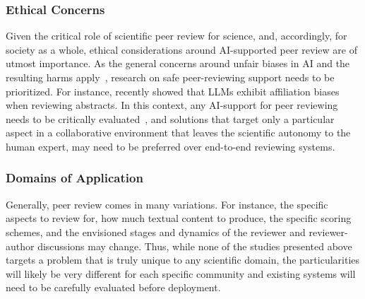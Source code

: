 \subsubsection{Ethical Concerns}
Given the critical role of scientific peer review for science, and, accordingly, for society as a whole, ethical considerations around AI-supported peer review are of utmost importance. As the general concerns around unfair biases in AI and the resulting harms apply~\cite{kuznetsov2024can}, research on safe peer-reviewing support needs to be prioritized. For instance, \citet{10.1001/jama.2023.24641} recently showed that %
LLMs exhibit 
affiliation biases when reviewing abstracts. In this context, any AI-support for peer reviewing needs to be critically evaluated~\cite{schintler2023critical}, and solutions that target only a particular aspect in a collaborative environment that leaves the scientific autonomy to the human expert, may need to be preferred over end-to-end reviewing systems.



\subsubsection{Domains of Application}
Generally, peer review comes in many variations. For instance, the specific aspects to review for, how much textual content to produce, the specific scoring schemes, and the envisioned stages and dynamics of the reviewer and reviewer-author discussions may change. Thus, while none of the studies presented above targets a problem that is truly unique to any scientific domain, the particularities will likely be very different for each specific community and existing systems will need to be carefully evaluated before deployment.

